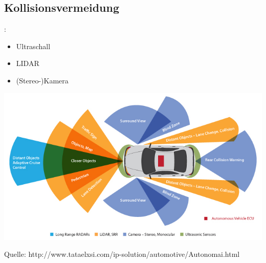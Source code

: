 \documentclass{beamer}
\begin{document}
\subsection{Kollisionsvermeidung}
\begin{frame}{\insertsection: \insertsubsection}
\begin{minipage}{0.35\linewidth}
	\begin{itemize}
		\item Ultraschall
		\item LIDAR
		\item (Stereo-)Kamera
	\end{itemize}
\end{minipage} \quad
\begin{minipage}{0.55\linewidth}
	\includegraphics[width=\linewidth]{suto}
	
	{\tiny Quelle: http://www.tataelxsi.com/ip-solution/automotive/Autonomai.html}
\end{minipage}
\end{frame}
\end{document}
